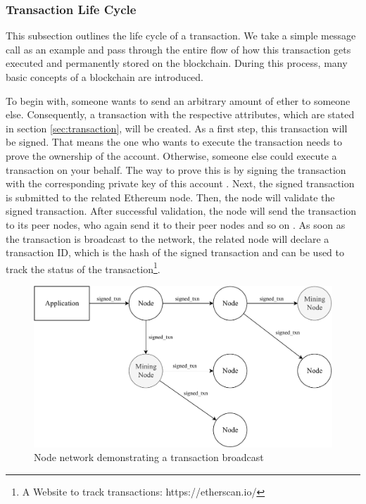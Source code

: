 \subsubsection{Transaction Life Cycle}
\label{sec:transaction_lifecycle}
This subsection outlines the life cycle of a transaction.
We take a simple message call as an example 
and pass through the entire flow of how this transaction 
gets executed and permanently stored on the blockchain. 
During this process, many basic concepts of a blockchain are introduced. 

To begin with, someone wants to send an arbitrary amount of ether to someone else. 
Consequently, a transaction with the respective attributes, which are stated 
in section \ref{sec:transaction}, will be created. As a first step, this transaction 
will be signed. That means the one who wants to execute the transaction needs to prove the 
ownership of the account. Otherwise, someone else could execute a transaction on your behalf. 
The way to prove this is by signing the transaction with the corresponding private
key of this account . 
Next, the signed transaction is submitted to the related Ethereum node. 
Then, the node will validate the signed transaction. 
After successful validation, the node will send the transaction to 
its peer nodes, who again send it to their 
peer nodes and so on . 
As soon as the transaction is broadcast to the network, 
the related node will declare a transaction ID, which is the hash 
of the signed transaction and can be used to track the 
status of the transaction\footnote{A Website to track transactions: https://etherscan.io/}. 

\begin{figure}[htbp]
	\centering
	\includegraphics[width=1\linewidth]{./figures/node_network.pdf}
	\caption{Node network demonstrating a transaction broadcast}
	\label{figure:node_network}
\end{figure}

